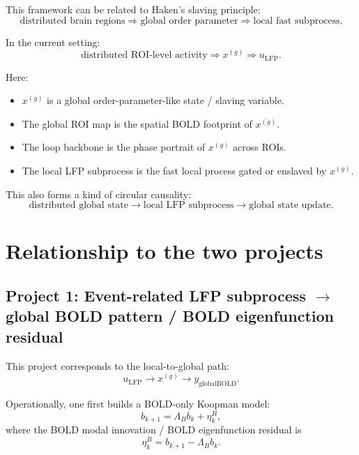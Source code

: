 \documentclass[11pt,a4paper]{article}
\begin{document}
This framework can be related to Haken's slaving principle:
\begin{equation}
\text{distributed brain regions}
\Rightarrow
\text{global order parameter}
\Rightarrow
\text{local fast subprocess}.
\end{equation}

In the current setting:
\begin{equation}
\text{distributed ROI-level activity}
\Rightarrow
x^{(g)}
\Rightarrow
u_{\mathrm{LFP}}.
\end{equation}

Here:
\begin{itemize}
    \item $x^{(g)}$ is a global order-parameter-like state / slaving variable.
    \item The global ROI map is the spatial BOLD footprint of $x^{(g)}$.
    \item The loop backbone is the phase portrait of $x^{(g)}$ across ROIs.
    \item The local LFP subprocess is the fast local process gated or enslaved by $x^{(g)}$.
\end{itemize}

This also forms a kind of circular causality:
\begin{equation}
\text{distributed global state}
\rightarrow
\text{local LFP subprocess}
\rightarrow
\text{global state update}.
\end{equation}

\section{Relationship to the two projects}

\subsection{Project 1: Event-related LFP subprocess $\to$ global BOLD pattern / BOLD eigenfunction residual}

This project corresponds to the local-to-global path:
\begin{equation}
    u_{\mathrm{LFP}} \rightarrow x^{(g)} \rightarrow y_{\mathrm{globalBOLD}}.
\end{equation}

Operationally, one first builds a BOLD-only Koopman model:
\begin{equation}
    b_{k+1}=\Lambda_B b_k + \eta_k^B,
\end{equation}
where the BOLD modal innovation / BOLD eigenfunction residual is
\begin{equation}
    \eta_k^B=b_{k+1}-\Lambda_B b_k.
\end{equation}
\end{document}
